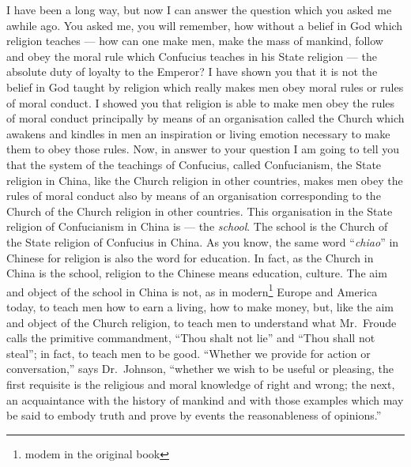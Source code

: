 \vspace{0.5cm}
I have been a long way, but now I can answer the question which you asked me awhile ago.
You asked me, you will remember, how without a belief in God which religion teaches --- how can one make men, make the mass of mankind, follow and obey the moral rule which Confucius teaches in his State religion --- the absolute duty of loyalty to the Emperor?
I have shown you that it is not the belief in God taught by religion which really makes men obey moral rules or rules of moral conduct.
I showed you that religion is able to make men obey the rules of moral conduct principally by means of an organisation called the Church which awakens and kindles in men an inspiration or living emotion necessary to make them to obey those rules.
Now, in answer to your question I am going to tell you that the system of the teachings of Confucius, called Confucianism, the State religion in China, like the Church religion in other countries, makes men obey the rules of moral conduct also by means of an organisation corresponding to the Church of the Church religion in other countries.
This organisation in the State religion of Confucianism in China is --- the \emph{school}.
The school is the Church of the State religion of Confucius in China.
As you know, the same word ``\emph{chiao}'' in Chinese for religion is also the word for education.
In fact, as the Church in China is the school, religion to the Chinese means education, culture.
The aim and object of the school in China is not, as in modern\footnote{modem in the original book} Europe and America today, to teach men how to earn a living, how to make money, but, like the aim and object of the Church religion, to teach men to understand what Mr.~Froude calls the primitive commandment, ``Thou shalt not lie'' and ``Thou shall not steal''; in fact, to teach men to be good.
``Whether we provide for action or conversation,'' says Dr.~Johnson, ``whether we wish to be useful or pleasing, the first requisite is the religious and moral knowledge of right and wrong; the next, an acquaintance with the history of mankind and with those examples which may be said to embody truth and prove by events the reasonableness of opinions.''

